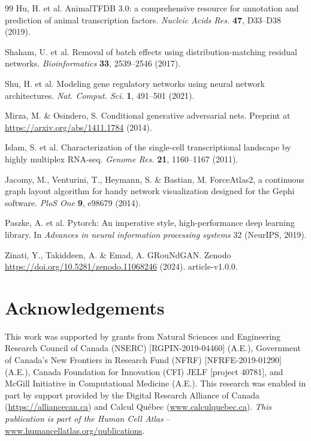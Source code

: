 \begin{singlespace}
\begin{thebibliography}{99\kern\bibindent}
Hu, H. et al. AnimalTFDB 3.0: a comprehensive resource for annotation and prediction of animal transcription factors. \textit{Nucleic Acids Res.} \textbf{47}, D33–D38 (2019).

Shaham, U. et al. Removal of batch effects using distribution-matching residual networks. \textit{Bioinformatics} \textbf{33}, 2539–2546 (2017).

Shu, H. et al. Modeling gene regulatory networks using neural
network architectures. \textit{Nat. Comput. Sci.} \textbf{1}, 491–501 (2021).

Mirza, M. \& Osindero, S. Conditional generative adversarial nets. Preprint at \href{https://arxiv.org/abs/1411.1784}{https://arxiv.org/abs/1411.1784} (2014).

Islam, S. et al. Characterization of the single-cell transcriptional
landscape by highly multiplex RNA-seq. \textit{Genome Res.} \textbf{21}, 1160–1167 (2011).

Jacomy, M., Venturini, T., Heymann, S. \& Bastian, M. ForceAtlas2, a
continuous graph layout algorithm for handy network visualization
designed for the Gephi software. \textit{PloS One} \textbf{9}, e98679 (2014).

Paszke, A. et al. Pytorch: An imperative style, high-performance
deep learning library. In \textit{Advances in neural information processing
systems} 32 (NeurIPS, 2019).

Zinati, Y., Takiddeen, A. \& Emad, A. GRouNdGAN. Zenodo \href{https://doi.org/10.5281/zenodo.11068246}{https://doi.org/10.5281/zenodo.11068246} (2024). article-v1.0.0.

\end{thebibliography}
\end{singlespace}

\section*{Acknowledgements}

This work was supported by grants from Natural Sciences and Engineering Research Council of Canada (NSERC) [RGPIN-2019-04460] (A.E.), Government of Canada’s New Frontiers in Research Fund (NFRF) [NFRFE-2019-01290] (A.E.), Canada Foundation for Innovation (CFI) JELF [project 40781], and McGill Initiative in Computational Medicine (A.E.). This research was enabled in part by support provided by the Digital Research Alliance of Canada (\url{https://alliancecan.ca}) and Calcul Québec (\url{www.calculquebec.ca}). \textit{This publication is part of the Human Cell Atlas} –\url{www.humancellatlas.org/publications}.

